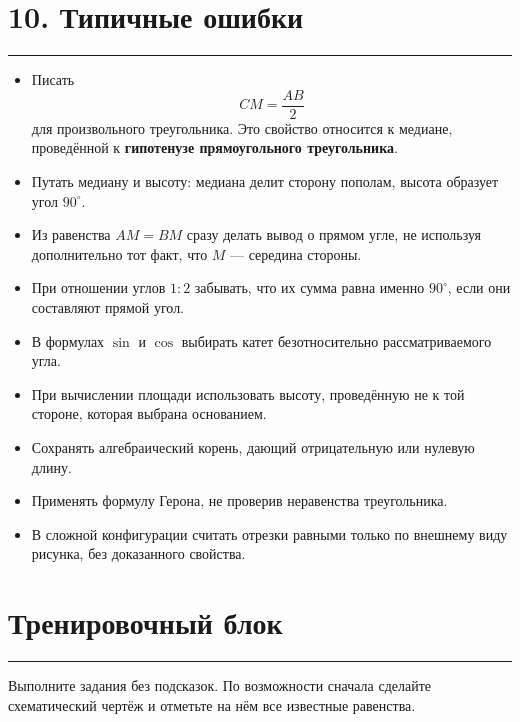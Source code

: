 \documentclass[a4paper,12pt]{article}
\newcommand{\checkitem}{\item[\textcolor{accent}{$\square$}]}
\newcommand{\sectionrule}{%
  \par\vspace{-0.35em}%
  {\color{accent!60}\rule{\linewidth}{0.7pt}}%
  \vspace{0.35em}
}
\begin{document}
\section*{\textcolor{darkaccent}{10. Типичные ошибки}}
\sectionrule

\begin{itemize}
  \checkitem Писать
  \[
  CM=\frac{AB}{2}
  \]
  для произвольного треугольника. Это свойство относится к медиане,
  проведённой к \textbf{гипотенузе прямоугольного треугольника}.

  \checkitem Путать медиану и высоту:
  медиана делит сторону пополам, высота образует угол \(90^\circ\).

  \checkitem Из равенства \(AM=BM\) сразу делать вывод о прямом угле,
  не используя дополнительно тот факт, что \(M\) --- середина стороны.

  \checkitem При отношении углов \(1:2\) забывать, что их сумма равна
  именно \(90^\circ\), если они составляют прямой угол.

  \checkitem В формулах \(\sin\) и \(\cos\) выбирать катет
  безотносительно рассматриваемого угла.

  \checkitem При вычислении площади использовать высоту,
  проведённую не к той стороне, которая выбрана основанием.

  \checkitem Сохранять алгебраический корень, дающий отрицательную
  или нулевую длину.

  \checkitem Применять формулу Герона, не проверив неравенства треугольника.

  \checkitem В сложной конфигурации считать отрезки равными
  только по внешнему виду рисунка, без доказанного свойства.
\end{itemize}

\clearpage
\section*{\textcolor{darkaccent}{Тренировочный блок}}
\sectionrule

Выполните задания без подсказок. По возможности сначала сделайте
схематический чертёж и отметьте на нём все известные равенства.
\end{document}

